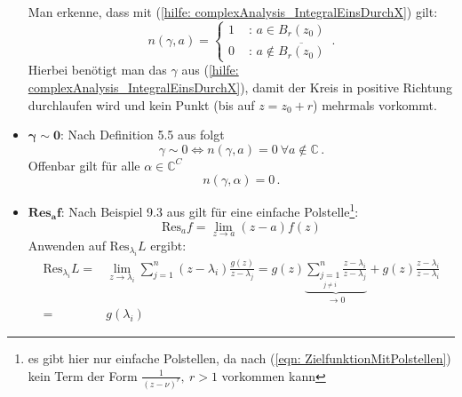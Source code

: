 \documentclass[a4paper,12pt]{report}
\newcommand{\C}{\mathbb C}
\newcommand{\1}{\mathds{1}}
\newcommand{\Res}{\text{Res}}
\theoremstyle{plain} %
\theoremstyle{definition} %
\theoremstyle{remark}
\begin{document}
\begin{itemize}
                        Man erkenne, dass mit (\ref{hilfe: complexAnalysis_IntegralEinsDurchX}) gilt:
                        \begin{equation}
                              \label{hilfe: complexAnalysis_WindungNullEins}
                              n(\gamma,a) = \begin{cases}
                                    1& \text{ : }a\in B_r(z_0)\\
                                    0& \text{ : }a\notin\overline {B_r(z_0)}
                              \end{cases}\,.
                        \end{equation}
                        Hierbei benötigt man das $\gamma$ aus (\ref{hilfe: complexAnalysis_IntegralEinsDurchX}),
                        damit der Kreis in positive Richtung durchlaufen wird und kein Punkt (bis auf $z=z_0+r$) mehrmals vorkommt.
                  \item $\mathbf{\gamma \sim 0}$:
                        Nach Definition 5.5 aus \cite[S. 67]{complexAnalysis} folgt
                        $$\gamma \sim 0 \Leftrightarrow n(\gamma, a)=0\ \forall a\notin \C\,.$$
                        Offenbar gilt für alle $\alpha \in \C^C$
                        $$n(\gamma, \alpha) = 0\,.$$

                  \item $\mathbf{\Res_af}$:
                        Nach Beispiel 9.3 aus \cite[S. 142]{complexAnalysis} gilt für eine einfache Polstelle\footnote{es gibt hier nur einfache Polstellen, da nach (\ref{eqn: ZielfunktionMitPolstellen}) kein Term der Form $\frac{1}{(z-\nu)^r},\ r>1$ vorkommen kann}:
                        \begin{equation}
                              \label{hilfe: complexAnalysis_Residuum}
                              \Res_af = \lim_{z\to a} (z-a)f(z)
                        \end{equation}
                        Anwenden auf $\Res_{\lambda_i}L$ ergibt:
                        \begin{align*}
                              \Res_{\lambda_i}L =& \lim_{z\to \lambda_i} \sum_{j=1}^{n} (z-\lambda_i)\frac{g(z)}{z-\lambda_j}
                              = g(z)\underbrace{\sum_{\underset{j\ne i}{j=1}}^{n} \frac{z-\lambda_i}{z-\lambda_j}}_{\to 0} + g(z)\frac{z-\lambda_i}{z-\lambda_i} \\
                              =& g(\lambda_i)
                        \end{align*}


\end{itemize}
\end{document}
